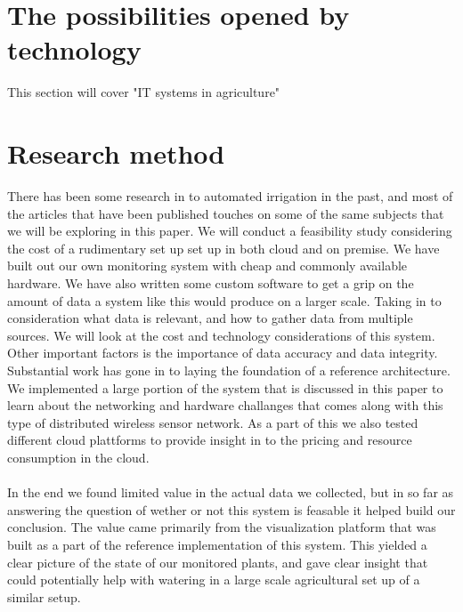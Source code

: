 \documentclass[]{uiophd}
\begin{document}
\section{The possibilities opened by technology}
This section will cover "IT systems in agriculture"

\section{Research method}
There has been some research in to automated irrigation in the past, and most of the articles that have been published touches on some of the same subjects that we will be exploring in this paper. We will conduct a feasibility study considering the cost of a rudimentary set up set up in both cloud and on premise. We have built out our own monitoring system with cheap and commonly available hardware. We have also written some custom software to get a grip on the amount of data a system like this would produce on a larger scale. Taking in to consideration what data is relevant, and how to gather data from multiple sources. We will look at the cost and technology considerations of this system. Other important factors is the importance of data accuracy and data integrity. Substantial work has gone in to laying the foundation of a reference architecture. We implemented a large portion of the system that is discussed in this paper to learn about the networking and hardware challanges that comes along with this type of distributed wireless sensor network. As a part of this we also tested different cloud plattforms to provide insight in to the pricing and resource consumption in the cloud. 
\\\\
In the end we found limited value in the actual data we collected, but in so far as answering the question of wether or not this system is feasable it helped build our conclusion. The value came primarily from the visualization platform that was built as a part of the reference implementation of this system. This yielded a clear picture of the state of our monitored plants, and gave clear insight that could potentially help with watering in a large scale agricultural set up of a similar setup.
\end{document}
